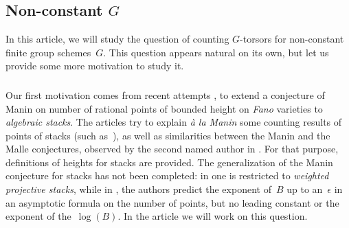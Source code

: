 \documentclass[a4paper,english,12pt]{amsart}
\numberwithin{equation}{subsection}
\begin{document}
\subsection{Non-constant $G$} In this article, we will study the question of counting $G$-torsors for non-constant finite group schemes~$G$. This question appears natural on its own, but let us provide some more motivation to study it. %
\subsubsection{} Our first motivation comes from recent attempts \cite{darda:tel-03682761}, \cite{Ellenberg} to extend a conjecture of Manin on number of rational points of bounded height on {\it Fano} varieties \cite{frankemanintschinkel} to {\it algebraic stacks}. %
The articles try to explain {\it \` a la Manin} some counting results of points of stacks (such as~\cite{Hortsch}), as well as similarities between the Manin and the Malle conjectures, observed by the second named author in \cite{Yasuda}. For that purpose, definitions of heights for stacks are provided. The generalization of the Manin conjecture for stacks has not been completed: in \cite{darda:tel-03682761} one is restricted to {\it weighted projective stacks}, while in \cite{Ellenberg}, the authors predict the exponent of~$B$ up to an~$\epsilon$ in an asymptotic formula on the number of points, but no leading constant or the exponent of the~$\log(B)$. In the article \cite{dardayasudabm} we will work on this question.
\end{document}

